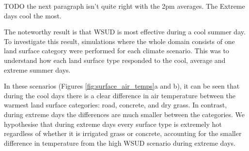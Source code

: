 \documentclass[final,3p,times,authoryear]{elsarticle}
\begin{document}
TODO the next paragraph isn't quite right with the 2pm averages. The Extreme days cool the most.

The noteworthy result is that WSUD is most effective during a cool summer day. To investigate this result, simulations where the whole domain consists of one land surface category were performed for each climate scenario. This was to understand how each land surface type responded to the cool, average and extreme summer days.

In these scenarios (Figures \ref{fig:surface_air_temps}a and b), it can be seen that during the cool days there is a clear difference in air temperature between the warmest land surface categories: road, concrete, and dry grass. In contrast, during extreme days the differences are much smaller between the categories. We hypothesise that during extreme days every surface type is extremely hot regardless of whether it is irrigated grass or concrete, accounting for the smaller difference in temperature from the high WSUD scenario during extreme days.
\end{document}
